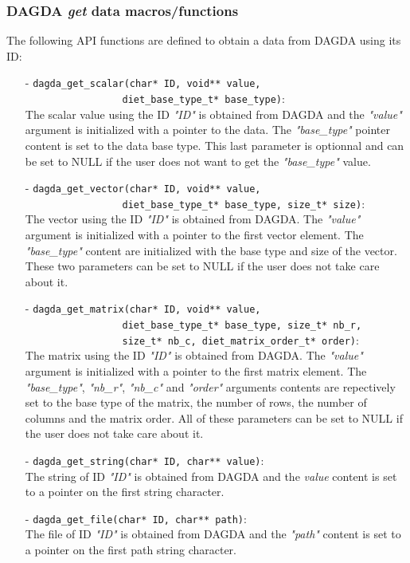 \subsubsection{DAGDA \textit{get} data macros/functions}
\label{sec:syncGetFunctions}
The following API functions are defined to obtain a data from DAGDA using
its ID:
\begin{itemize}
  \item[-] \verb#dagda_get_scalar(char* ID, void** value,#\\
           \verb#                 diet_base_type_t* base_type)#:\\
    The scalar value using the ID \textit{"ID"} is obtained from DAGDA and the
    \textit{"value"} argument is initialized with a pointer to the data.
    The \textit{"base\_type"} pointer content is set to the data base type.
    This last parameter is optionnal and can be set to NULL if the user does not
    want to get the \textit{"base\_type"} value.
  \item[-] \verb#dagda_get_vector(char* ID, void** value,#\\
           \verb#                 diet_base_type_t* base_type, size_t* size)#:\\
    The vector using the ID \textit{"ID"} is obtained from DAGDA. The
    \textit{"value"} argument is initialized with a pointer to the first
    vector element. The \textit{"base\_type"} content are initialized with
    the base type and size of the vector. These two parameters can be set to
    NULL if the user does not take care about it.
  \item[-] \verb#dagda_get_matrix(char* ID, void** value,#\\
           \verb#                 diet_base_type_t* base_type, size_t* nb_r,#\\
           \verb#                 size_t* nb_c, diet_matrix_order_t* order)#:\\
    The matrix using the ID \textit{"ID"} is obtained from DAGDA. The
    \textit{"value"} argument is initialized with a pointer to the first
    matrix element. The \textit{"base\_type"}, \textit{"nb\_r"},
    \textit{"nb\_c"} and \textit{"order"} arguments contents are repectively set
    to the base type of the matrix, the number of rows, the number of columns
    and the matrix order. All of these parameters can be set to NULL if the
    user does not take care about it.
  \item[-] \verb#dagda_get_string(char* ID, char** value)#:\\
    The string of ID \textit{"ID"} is obtained from DAGDA and the
    \textit{value} content is set to a pointer on the first string character.
  \item[-] \verb#dagda_get_file(char* ID, char** path)#:\\
    The file of ID \textit{"ID"} is obtained from DAGDA and the
    \textit{"path"} content is set to a pointer on the first path string
    character.
\end{itemize}

